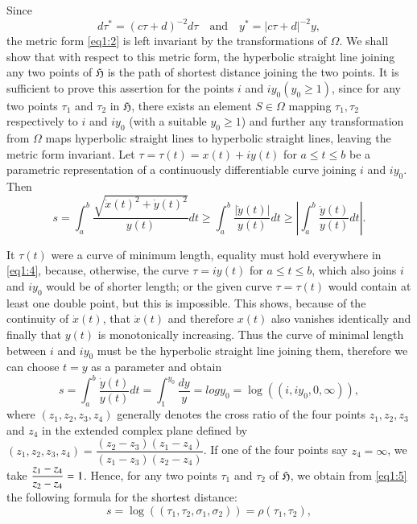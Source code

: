 Since 
\begin{equation*}
d\tau^{\ast} = (c\tau + d)^{-2} d \tau \quad \text{and} \quad y^{\ast}
= |c\tau+d|^{-2} y, \tag{3}\label{eq1:3}
\end{equation*}
the metric form \eqref{eq1:2} is left invariant by the transformations of
$\Omega$. We shall show that with respect to this metric form, the
hyperbolic straight line joining any two points of $\mathfrak{H}$ is
the path of shortest distance joining the two points. It is sufficient
to prove this assertion for the points $i$ and $iy_0(y_0 \geq
1)$, \pageoriginale since for any two points $\tau_1$ and $\tau_2$ in
$\mathfrak{H}$, there exists an element $S\in \Omega$ mapping
$\tau_1, \tau_2$ respectively to $i$ and $iy_0$ (with a suitable
$y_0\geq 1$) and further any transformation from $\Omega$ maps
hyperbolic straight lines to hyperbolic straight lines, leaving the
metric form invariant. Let $\tau=\tau(t) = x(t) + iy (t)$ for $a\leq t
\leq b$ be a parametric representation of a continuously
differentiable curve joining $i$ and $iy_0$. Then
\begin{equation*}
s = \int^b_a \frac{\sqrt{\dot{x}(t)^2 + \dot{y}(t)^2}}{y(t)} dt \geq
\int^b_a \frac{|\dot{y}(t)|}{y(t)} dt \geq \left|\int^b_a
\frac{\dot{y}(t)}{y(t)}dt\right| . \tag{4}\label{eq1:4}
\end{equation*}

It $\tau(t)$ were a curve of minimum length, equality must hold
everywhere in \eqref{eq1:4}, because, otherwise, the curve $\tau=iy(t)$ for
$a\leq t \leq b$, which also joins $i$ and $iy_0$ would be of shorter
length; or the given curve $\tau=\tau(t)$ would contain at least one
double point, but this is impossible. This shows, because of the
continuity of $\dot{x}(t)$, that $\dot{x}(t)$ and therefore $x(t)$
also vanishes identically and finally that $y(t)$ is monotonically
increasing. Thus the curve of minimal length between $i$ and $iy_0$
must be the hyperbolic straight line joining them, therefore we can
choose $t=y$ as a parameter and obtain
\begin{equation*}
s = \int^b_a \frac{\dot{y}(t)}{y(t)} dt = \int^{y_0}_1 \frac{dy}{y} =
log y_0 = \log ((i, iy_0, 0, \infty)), \tag{5}\label{eq1:5}
\end{equation*}
where $(z_1, z_2, z_3, z_4)$ generally denotes the cross ratio of the
four points $z_1, z_2, z_3$ and $z_4$ in the extended complex plane
defined by $(z_1, z_2, z_3, z_4)=
\dfrac{(z_2-z_3)(z_1-z_4)}{(z_1-z_3)(z_2-z_4)}$. If one of the four
points say $z_4=\infty$, we take $\dfrac{z_1-z_4}{z_2-z_4}\break =1$. Hence,
for any two points $\tau_1$ and $\tau_2$ of $\mathfrak{H}$, we obtain
from \eqref{eq1:5} \pageoriginale the following formula for the shortest distance:
\begin{equation*}
s = \log ((\tau_1, \tau_2, \sigma_1, \sigma_2)) = \rho(\tau_1,
\tau_2), \tag{6}\label{eq1:6}
\end{equation*}

